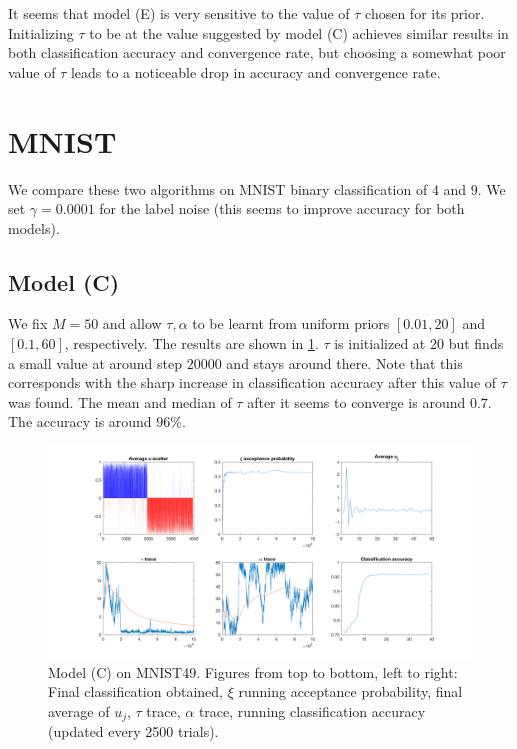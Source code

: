 \documentclass{siamart1116}
\begin{document}
        It seems that model (E) is very sensitive to the value of $\tau$ chosen for its prior. Initializing $\tau$ to be at the value suggested by model (C) achieves similar results in both classification accuracy and convergence rate, but choosing a somewhat poor value of $\tau$ leads to a noticeable drop in accuracy and convergence rate.

\section{MNIST}
    We compare these two algorithms on MNIST binary classification of $4$ and $9$. We set $\gamma = 0.0001$ for the label noise (this seems to improve accuracy for both models).
        \subsection{Model (C)}
            We fix $M=50$ and allow $\tau, \alpha$ to be learnt from uniform priors $[0.01, 20]$ and $[0.1, 60]$, respectively. The results are shown in \cref{fig:model_c_mnist}. $\tau$ is initialized at $20$ but finds a small value at around step $20000$ and stays around there. Note that this corresponds with the sharp increase in classification accuracy after this value of $\tau$ was found. The mean and median of $\tau$ after it seems to converge is around $0.7$. The accuracy is around $96\%$.
        \begin{figure}[!htb]
            \caption{\label{fig:model_c_mnist}Model (C) on MNIST49. Figures from top to bottom, left to right: Final classification obtained, $\xi$ running acceptance probability, final average of $u_j$, $\tau$ trace, $\alpha$ trace, running classification accuracy (updated every 2500 trials).}
            \includegraphics[width=\linewidth]{mnist/learn_t_a/all.png}
        \end{figure}
\end{document}
